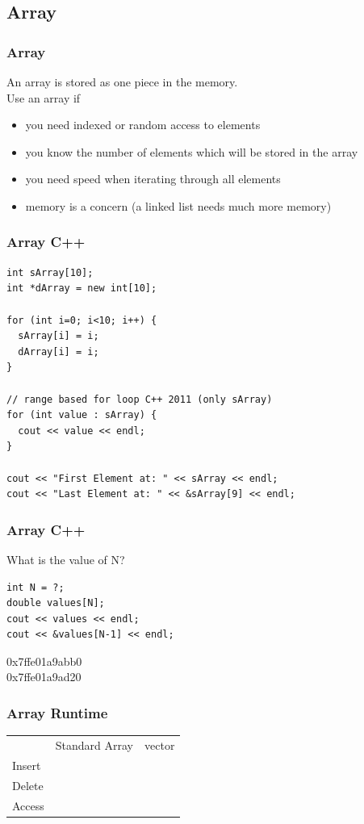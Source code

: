\subsection{Array}
\begin{frame}[fragile]
\frametitle{Array}
An array is stored as one piece in the memory.\\
Use an array if
\begin{itemize}
\item you need indexed or random access to elements
\item you know the number of elements which will be stored in the array
\item you need speed when iterating through all elements
\item memory is a concern (a linked list needs much more memory)
\end{itemize}
\end{frame}

\begin{frame}[fragile]
\frametitle{Array C++}
{\small
\begin{lstlisting}
int sArray[10];
int *dArray = new int[10];

for (int i=0; i<10; i++) {
  sArray[i] = i;
  dArray[i] = i;
}

// range based for loop C++ 2011 (only sArray)
for (int value : sArray) {
  cout << value << endl;
}

cout << "First Element at: " << sArray << endl;
cout << "Last Element at: " << &sArray[9] << endl;
\end{lstlisting}
}
\end{frame}

\begin{frame}[fragile]
\frametitle{Array C++}

\begin{exercise}
What is the value of N?
\begin{lstlisting}
int N = ?;
double values[N];
cout << values << endl;
cout << &values[N-1] << endl;
\end{lstlisting}

0x7ffe01a9abb0\\
0x7ffe01a9ad20
\end{exercise}
\end{frame}

\begin{frame}[fragile]
\frametitle{Array Runtime}
\begin{tabular}{lll}
 & Standard Array & vector\\
Insert & & \\
Delete & & \\
Access & & \\
\end{tabular}
\end{frame}


